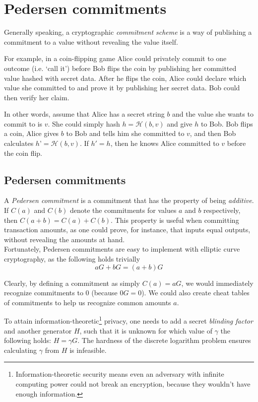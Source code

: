 

\chapter{Pedersen commitments}
\label{chapter:pedersen-commitments}


Generally speaking, a cryptographic {\em commitment scheme} is a way of publishing a commitment to a value without revealing the value itself.

For example, in a coin-flipping game Alice could privately commit to one outcome (i.e. ‘call it’) before Bob flips the coin by publishing her committed value hashed with secret data. After he flips the coin, Alice could declare which value she committed to and prove it by publishing her secret data. Bob could then verify her claim.

In other words, assume that Alice has a secret string $b$ and the value she wants to commit to is $v$. She could simply hash $h = \mathcal{H}(b, v)$ and give $h$ to Bob. Bob flips a coin, Alice gives $b$ to Bob and tells him she committed to $v$, and then Bob calculates $h’ = \mathcal{H}(b, v)$. If $h' = h$, then he knows Alice committed to $v$ before the coin flip.
\\

\section{Pedersen commitments}
\label{pedersen_section}

A {\em Pedersen commitment} \cite{Pedersen1992} is a commitment that has the property of being {\em additive}. If \(C(a)\) and \(C(b)\) denote the commitments for values \(a\) and \(b\) respectively, then \(C(a + b) = C(a) + C(b)\). This property is useful when committing transaction amounts, as one could prove, for instance, that inputs equal outputs, without revealing the amounts at hand.
\\

Fortunately, Pedersen commitments are easy to implement with elliptic curve cryptography, as the following holds trivially \[a G + b G = (a + b) G\]

Clearly, by defining a commitment as simply \(C(a) = a G\), we would immediately recognize commitments to 0 (because $0G = 0$). We could also create cheat tables of commitments to help us recognize common amounts $a$.

To attain information-theoretic\footnote{\label{information_theoretic_note}Information-theoretic security means even an adversary with infinite computing power could not break an encryption, because they wouldn’t have enough information.} privacy, one needs to add a secret {\em blinding factor} and another generator \(H\), such that it is unknown for which value of \(\gamma\) the following holds: \(H = \gamma G\). The hardness of the discrete logarithm problem ensures calculating $\gamma$ from $H$ is infeasible.

